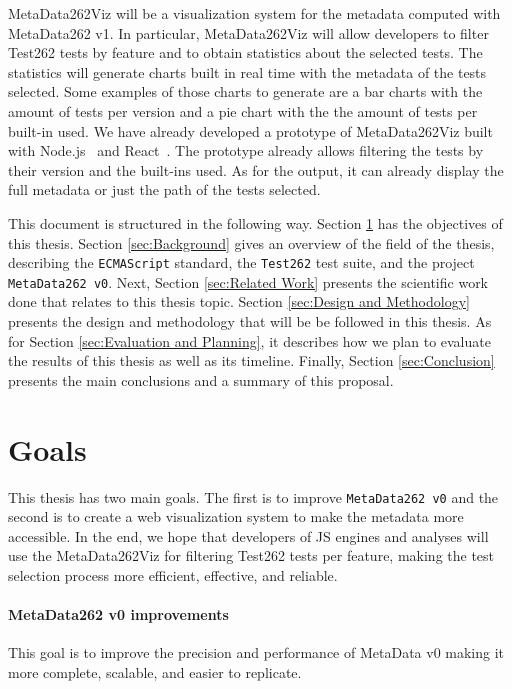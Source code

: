 \documentclass[runningheads]{llncs}
\begin{document}
MetaData262Viz will be a visualization system for the metadata computed with MetaData262 v1. In particular, MetaData262Viz will allow developers to filter Test262 tests by feature and to obtain statistics about the selected tests. The statistics will generate charts built in real time with the metadata of the tests selected. Some examples of those charts to generate are a bar charts with the amount of tests per version and a pie chart with the the amount of tests per built-in used.
We have already developed a prototype of MetaData262Viz built with Node.js~\cite{Node.js} and React~\cite{React}. The prototype already allows filtering the tests by their version and the built-ins used. As for the output, it can already display the full metadata or just the path of the tests selected.


This document is structured in the following way. Section \ref{sec:Goals} has the objectives of this thesis. Section \ref{sec:Background} gives an overview of the field of the thesis, describing the \texttt{ECMAScript} standard, the \texttt{Test262} test suite, and the project \texttt{MetaData262 v0}. Next, Section \ref{sec:Related Work} presents the scientific work done that relates to this thesis topic. Section \ref{sec:Design and Methodology} presents the design and methodology that will be be followed in this thesis. As for Section \ref{sec:Evaluation and Planning}, it describes how we plan to evaluate the results of this thesis as well as its timeline. Finally, Section \ref{sec:Conclusion} presents the main conclusions and a summary of this proposal. 



\section{Goals}
\label{sec:Goals}


This thesis has two main goals. The first is to improve \texttt{MetaData262 v0} and the second is to create a web visualization system to make the metadata more accessible.
%
In the end, we hope that developers of JS engines and analyses will use the MetaData262Viz for filtering Test262 tests per feature, making the test selection process more efficient, effective, and reliable.

\paragraph{MetaData262 v0 improvements}
This goal is to improve the precision and performance of MetaData v0 making it more complete, scalable, and easier to replicate.
\end{document}
